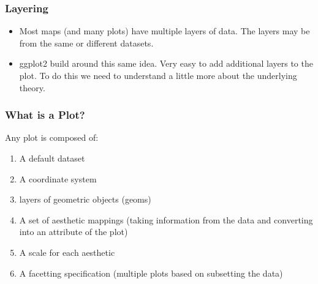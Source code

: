 \documentclass{beamer}\usepackage[]{graphicx}\usepackage[]{color}
\begin{document}

\begin{frame}[fragile]
\frametitle{Layering}
   \begin{itemize}
    \item Most maps (and many plots) have multiple layers of data. The layers may be from the same or different datasets.\bigskip
    \item ggplot2 build around this same idea. Very easy to add additional layers to the plot. To do this we need to understand a little more about the underlying theory.
\end{itemize} 
\small

    \normalsize
\end{frame}


\begin{frame}[fragile]
\frametitle{What is a Plot?}
    Any plot is composed of:
   \begin{enumerate}
    \item A default dataset 
    \item A coordinate system
    \item layers of geometric objects (geoms)
    \item A set of aesthetic mappings (taking information from the data and converting into an attribute of the plot)
    \item A scale for each aesthetic
    \item A facetting specification (multiple plots based on subsetting the data)
\end{enumerate} 
\end{frame}

\end{document}
